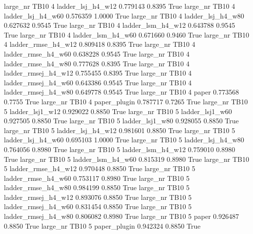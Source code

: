   large_nr     TB10                 4   ladder_lsj_h4_w12    0.779143      0.8395    True
  large_nr     TB10                 4   ladder_lsj_h4_w60    0.576359      1.0000    True
  large_nr     TB10                 4   ladder_lsj_h4_w80    0.627632      0.9545    True
  large_nr     TB10                 4   ladder_lsm_h4_w12    0.643788      0.9545    True
  large_nr     TB10                 4   ladder_lsm_h4_w60    0.671660      0.9460    True
  large_nr     TB10                 4  ladder_rmse_h4_w12    0.809418      0.8395    True
  large_nr     TB10                 4  ladder_rmse_h4_w60    0.638228      0.9545    True
  large_nr     TB10                 4  ladder_rmse_h4_w80    0.777628      0.8395    True
  large_nr     TB10                 4 ladder_rmsej_h4_w12    0.755455      0.8395    True
  large_nr     TB10                 4 ladder_rmsej_h4_w60    0.643386      0.9545    True
  large_nr     TB10                 4 ladder_rmsej_h4_w80    0.649778      0.9545    True
  large_nr     TB10                 4               paper    0.773568      0.7755    True
  large_nr     TB10                 4        paper_plugin    0.787717      0.7265    True
  large_nr     TB10                 5     ladder_lsj1_w12    0.929022      0.8850    True
  large_nr     TB10                 5     ladder_lsj1_w60    0.927505      0.8850    True
  large_nr     TB10                 5     ladder_lsj1_w80    0.928055      0.8850    True
  large_nr     TB10                 5   ladder_lsj_h4_w12    0.981601      0.8850    True
  large_nr     TB10                 5   ladder_lsj_h4_w60    0.695103      1.0000    True
  large_nr     TB10                 5   ladder_lsj_h4_w80    0.764056      0.8980    True
  large_nr     TB10                 5   ladder_lsm_h4_w12    0.759010      0.8980    True
  large_nr     TB10                 5   ladder_lsm_h4_w60    0.815319      0.8980    True
  large_nr     TB10                 5  ladder_rmse_h4_w12    0.970448      0.8850    True
  large_nr     TB10                 5  ladder_rmse_h4_w60    0.753117      0.8980    True
  large_nr     TB10                 5  ladder_rmse_h4_w80    0.984199      0.8850    True
  large_nr     TB10                 5 ladder_rmsej_h4_w12    0.893076      0.8850    True
  large_nr     TB10                 5 ladder_rmsej_h4_w60    0.831454      0.8850    True
  large_nr     TB10                 5 ladder_rmsej_h4_w80    0.806082      0.8980    True
  large_nr     TB10                 5               paper    0.926487      0.8850    True
  large_nr     TB10                 5        paper_plugin    0.942324      0.8850    True
